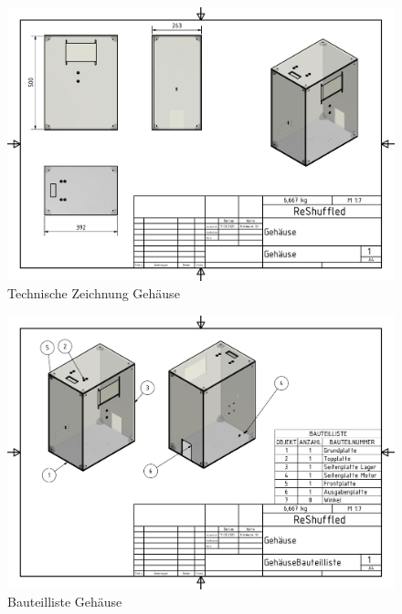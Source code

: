\begin{figure}
    \centering
    \includegraphics[scale=0.85,page=1]{fig/mech/Gehaeuse.pdf}
    \caption{Technische Zeichnung Gehäuse}
\end{figure}

\begin{figure}
    \centering
    \includegraphics[scale=0.85,page=1, rotate=270]{fig/mech/GehaeuseBauteilliste.pdf}
    \caption{Bauteilliste Gehäuse}
\end{figure}

